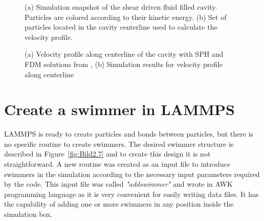 \begin{figure}[ht]
\centering
  \begin{footnotesize}
  
  \caption[(a) Simulation snapshot of the shear driven fluid filled cavity. Particles are colored according to their kinetic energy. (b) Set of particles located in the cavity centerline used to calculate the velocity profile.]{(a) Simulation snapshot of the shear driven fluid filled cavity. Particles are colored according to their kinetic energy. (b) Set of particles located in the cavity centerline used to calculate the velocity profile.}
  \label{fig:Bild3.1}
  \end{footnotesize}
\end{figure} 



\begin{figure}[H]
\centering
  \begin{footnotesize}
  
  \caption[(a) Velocity profile along centerline of the cavity with SPH and FDM (Finite Difference Method) solutions from \cite{neece_tait_1968} , (b) Simulation results for velocity profile along centerline ]{(a) Velocity profile along centerline of the cavity with SPH and FDM solutions from \cite{neece_tait_1968} , (b) Simulation results for velocity profile along centerline }
  \label{fig:Bild3.2}
  \end{footnotesize}
\end{figure} 



\section{Create a swimmer in LAMMPS}
\label{sec:section 2}

LAMMPS is ready to create particles and bonds between particles, but there is no specific routine to create swimmers. The desired swimmer structure is described in Figure~\ref{fig:Bild2.7}
and to create this design it is not straightforward. A new routine was created as an input file to introduce swimmers in the simulation according to the necessary input parameters
required by the code. This input file was called \textit{"addswimmer"} and wrote in AWK programming language as it is very convenient for easily writing data files. It has 
the capability of adding one or more swimmers in any position inside the simulation box.\par

